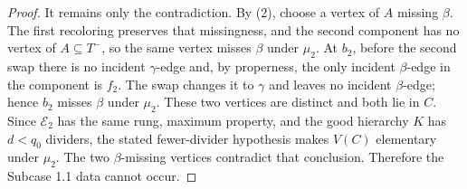 \begin{proof}
It remains only the contradiction.  By (2), choose a vertex of $A$
missing $\beta$.  The first recoloring preserves that missingness, and
the second component has no vertex of $A\subseteq T^-$, so the same
vertex misses $\beta$ under $\mu_2$.  At $b_2$, before the second swap
there is no incident $\gamma$-edge and, by properness, the only incident
$\beta$-edge in the component is $f_2$.  The swap changes it to
$\gamma$ and leaves no incident $\beta$-edge; hence $b_2$ misses
$\beta$ under $\mu_2$.  These two vertices are distinct and both lie in
$C$.  Since $\mathcal E_2$ has the same rung, maximum property, and the
good hierarchy $K$ has $d<q_0$ dividers, the stated fewer-divider
hypothesis makes $V(C)$ elementary under $\mu_2$.  The two
$\beta$-missing vertices contradict that conclusion.  Therefore the
Subcase 1.1 data cannot occur.
\end{proof}
